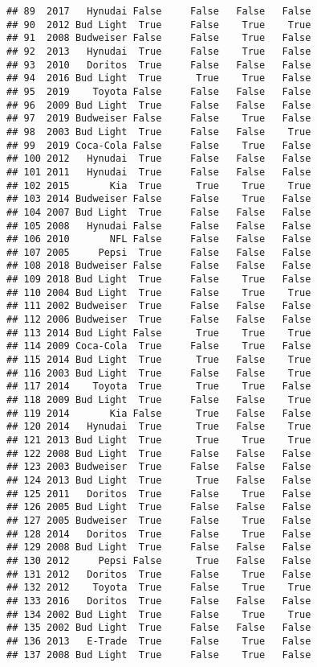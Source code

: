 \documentclass[
]{article}
\begin{document}
\begin{verbatim}
## 89  2017   Hynudai False     False   False   False
## 90  2012 Bud Light  True     False    True    True
## 91  2008 Budweiser False     False    True   False
## 92  2013   Hynudai  True     False    True   False
## 93  2010   Doritos  True     False   False   False
## 94  2016 Bud Light  True      True    True   False
## 95  2019    Toyota False     False   False   False
## 96  2009 Bud Light  True     False   False   False
## 97  2019 Budweiser False     False    True   False
## 98  2003 Bud Light  True     False   False    True
## 99  2019 Coca-Cola False     False    True   False
## 100 2012   Hynudai  True     False   False   False
## 101 2011   Hynudai  True     False   False   False
## 102 2015       Kia  True      True    True    True
## 103 2014 Budweiser False     False    True   False
## 104 2007 Bud Light  True     False   False   False
## 105 2008   Hynudai False     False   False   False
## 106 2010       NFL False     False   False   False
## 107 2005     Pepsi  True     False   False   False
## 108 2018 Budweiser False     False   False   False
## 109 2018 Bud Light  True     False    True   False
## 110 2004 Bud Light  True     False    True    True
## 111 2002 Budweiser  True     False   False   False
## 112 2006 Budweiser  True     False   False   False
## 113 2014 Bud Light False      True    True    True
## 114 2009 Coca-Cola  True     False    True   False
## 115 2014 Bud Light  True      True   False    True
## 116 2003 Bud Light  True     False   False    True
## 117 2014    Toyota  True      True    True   False
## 118 2009 Bud Light  True     False   False    True
## 119 2014       Kia False      True   False   False
## 120 2014   Hynudai  True      True   False    True
## 121 2013 Bud Light  True      True    True    True
## 122 2008 Bud Light  True     False   False   False
## 123 2003 Budweiser  True     False   False   False
## 124 2013 Bud Light  True      True   False   False
## 125 2011   Doritos  True     False    True   False
## 126 2005 Bud Light  True     False   False   False
## 127 2005 Budweiser  True     False    True   False
## 128 2014   Doritos  True     False    True   False
## 129 2008 Bud Light  True     False   False   False
## 130 2012     Pepsi False      True   False   False
## 131 2012   Doritos  True     False    True   False
## 132 2012    Toyota  True     False    True    True
## 133 2016   Doritos  True     False   False   False
## 134 2002 Bud Light  True     False    True    True
## 135 2002 Bud Light  True     False   False   False
## 136 2013   E-Trade  True     False    True   False
## 137 2008 Bud Light  True     False    True   False

\end{verbatim}
\end{document}
